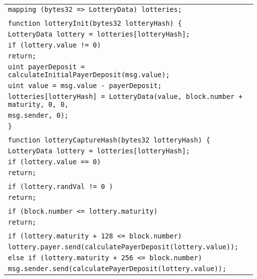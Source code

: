 \documentclass[a4paper]{article}
\begin{document}
\begin{tabularx}{\linewidth}{l}
        \\
        \qquad\texttt{mapping (bytes32 => LotteryData) lotteries;}\\
        \\
        \qquad\texttt{function lotteryInit(bytes32 lotteryHash) \{}\\
        \qquad\qquad\texttt{LotteryData lottery = lotteries[lotteryHash];}\\
        \qquad\qquad\texttt{if (lottery.value != 0)}\\
        \qquad\qquad\qquad\texttt{return;}\\
        \qquad\qquad\texttt{uint payerDeposit = calculateInitialPayerDeposit(msg.value);}\\
        \qquad\qquad\texttt{uint value = msg.value - payerDeposit;}\\
        \qquad\qquad\texttt{lotteries[lotteryHash] = LotteryData(value, block.number + maturity, 0, 0,}\\
        \qquad\qquad\qquad\qquad\qquad\qquad\qquad\qquad\qquad\qquad\qquad\qquad\texttt{msg.sender, 0);}\\
        \qquad\texttt{\}}\\
        \\
        \qquad\texttt{function lotteryCaptureHash(bytes32 lotteryHash) \{}\\
        \qquad\qquad\texttt{LotteryData lottery = lotteries[lotteryHash];}\\
        \qquad\qquad\texttt{if (lottery.value == 0)}\\
        \qquad\qquad\qquad\texttt{return;}\\
        \\
        \qquad\qquad\texttt{if (lottery.randVal != 0 )}\\
        \qquad\qquad\qquad\texttt{return;}\\
        \\
        \qquad\qquad\texttt{if (block.number <= lottery.maturity)}\\
        \qquad\qquad\qquad\texttt{return;}\\
        \\
        \qquad\qquad\texttt{if (lottery.maturity + 128 <= block.number)}\\
        \qquad\qquad\qquad\texttt{lottery.payer.send(calculatePayerDeposit(lottery.value));}\\
        \qquad\qquad\texttt{else if~(lottery.maturity + 256 <= block.number)}\\
        \qquad\qquad\qquad\texttt{msg.sender.send(calculatePayerDeposit(lottery.value));}\\

\end{tabularx}
\end{document}
